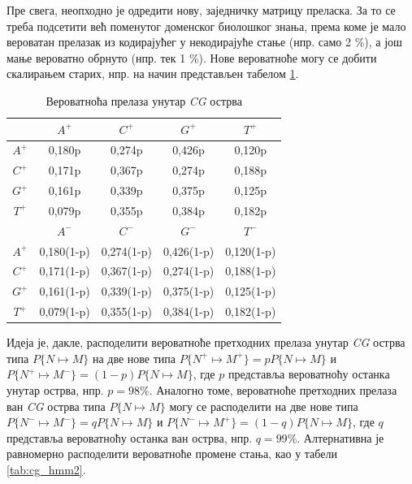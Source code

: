 \documentclass[12pt,oneside]{memoir}
\begin{document}
\begin{CJK}{UTF8}{ipxm}
Пре свега, неопходно је одредити нову, заједничку матрицу преласка. За то се треба подсетити већ поменутог доменског биолошког знања, према коме је мало вероватан прелазак из кодирајућег у некодирајуће стање (нпр. само 2 \%), а још мање вероватно обрнуто (нпр. тек 1 \%). Нове вероватноће могу се добити скалирањем старих, нпр. на начин представљен табелом \ref{tab:cg_hmm1}.

\begin{table}[h!]
  \centering
  \caption{Вероватноћа прелаза унутар \textit{CG} острва}
  \begin{tabular}{c | c c c c}
   & $A^+$ & $C^+$ & $G^+$ & $T^+$ \\ \hline
  $A^+$ & 0,180p & 0,274p & 0,426p & 0,120p \\
  $C^+$ & 0,171p & 0,367p & 0,274p & 0,188p \\
  $G^+$ & 0,161p & 0,339p & 0,375p & 0,125p \\
  $T^+$ & 0,079p & 0,355p & 0,384p & 0,182p \\ \hhline{= | = = = =}
   & $A^-$ & $C^-$ & $G^-$ & $T^-$ \\ \hline
  $A^+$ & 0,180(1-p) & 0,274(1-p) & 0,426(1-p) & 0,120(1-p) \\
  $C^+$ & 0,171(1-p) & 0,367(1-p) & 0,274(1-p) & 0,188(1-p) \\
  $G^+$ & 0,161(1-p) & 0,339(1-p) & 0,375(1-p) & 0,125(1-p) \\
  $T^+$ & 0,079(1-p) & 0,355(1-p) & 0,384(1-p) & 0,182(1-p)
  \end{tabular}
  \label{tab:cg_hmm1}
\end{table}

Идеја је, дакле, расподелити вероватноће претходних прелаза унутар \textit{CG} острва типа $P\{N \mapsto M\}$ на две нове типа $P\{N^+ \mapsto M^+\} = p P\{N \mapsto M\}$ и $P\{N^+ \mapsto M^-\} = (1-p) P\{N \mapsto M\}$, где $p$ представља вероватноћу останка унутар острва, нпр. $p = 98 \%$. Аналогно томе, вероватноће претходних прелаза ван \textit{CG} острва типа $P\{N \mapsto M\}$ могу се расподелити на две нове типа $P\{N^- \mapsto M^-\} = q P\{N \mapsto M\}$ и $P\{N^- \mapsto M^+\} = (1-q) P\{N \mapsto M\}$, где $q$ представља вероватноћу останка ван острва, нпр. $q = 99 \%$. Алтернативна је равномерно расподелити вероватноће промене стања, као у табели \ref{tab:cg_hmm2}.


\end{CJK}
\end{document}
